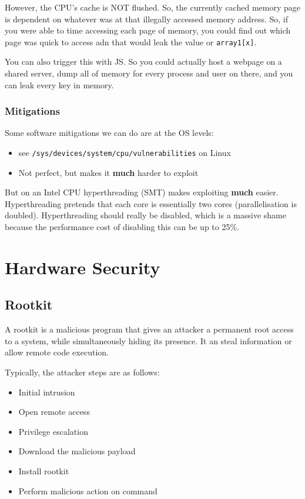 \documentclass[11pt,a4paper,titlepage,dvipsnames,cmyk]{scrartcl}
\begin{document}
However, the CPU's cache is NOT flushed. So, the currently cached memory page is dependent on whatever was at that illegally accessed memory address. So, if you were able to time accessing each page of memory, you could find out which page was quick to access adn that would leak the value or \texttt{array1[x]}.

You can also trigger this with JS. So you could actually host a webpage on a shared server, dump all of memory for every process and user on there, and you can leak every key in memory.

\subsubsection{Mitigations}
Some software mitigations we can do are at the OS levels:
\begin{itemize}
    \item see \texttt{/sys/devices/system/cpu/vulnerabilities} on Linux
    \item Not perfect, but makes it \textbf{much} harder to exploit
\end{itemize}

But on an Intel CPU hyperthreading (SMT) makes exploiting \textbf{much} easier. Hyperthreading pretends that each core is essentially two cores (parallelisation is doubled). Hyperthreading should really be disabled, which is a massive shame because the performance cost of disabling this can be up to 25\%. 

\section{Hardware Security}
\subsection{Rootkit}
A rootkit is a malicious program that gives an attacker a permanent root access to a system, while simultaneously hiding its presence. It an steal information or allow remote code execution.

Typically, the attacker steps are as follows:
\begin{itemize}
    \item Initial intrusion
    \item Open remote access
    \item Privilege escalation
    \item Download the malicious payload
    \item Install rootkit
    \item Perform malicious action on command
\end{itemize}
\end{document}
